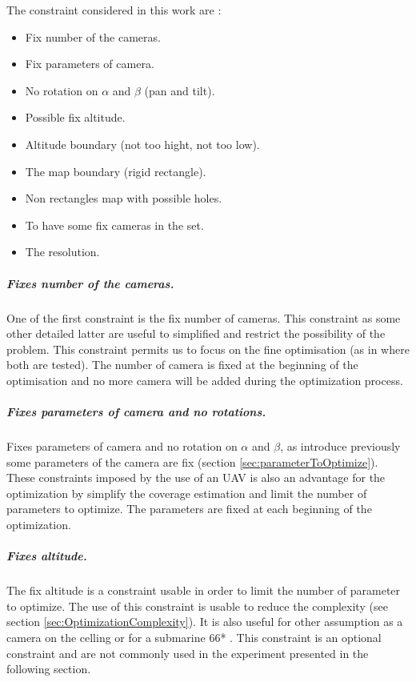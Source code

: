 The constraint considered in this work are : 
\begin{itemize}
	\item Fix number of the cameras.
	\item Fix parameters of camera.
	\item No rotation  on  $\alpha$ and $\beta$ (pan and tilt).
	\item Possible fix altitude.
	\item Altitude boundary (not too hight, not too low).  	
	\item The map boundary (rigid rectangle).  
	\item Non rectangles map with possible holes.
	\item To have some fix cameras in the set. 
	\item The resolution.\\

\end{itemize} 
\subparagraph{Fixes number of the cameras.}
One of the first constraint is the fix number of cameras. This constraint as some other detailed latter are  useful to simplified and restrict the possibility of the problem. This constraint permits us to focus on the fine optimisation (as in \citep{22*zhao2008} where both are tested). The number of camera is fixed at the beginning of the optimisation and no more camera will be added during the optimization process.  \\

\subparagraph{Fixes parameters of camera and no rotations.}
Fixes parameters of camera and no rotation on  $\alpha$ and $\beta$, as introduce previously some parameters of the camera are fix (section \ref{sec:parameterToOptimize}). These constraints imposed by the use of an UAV is also an advantage for the optimization by simplify the coverage estimation and limit the number of parameters to optimize. The parameters are fixed at each beginning of the optimization.\\

\subparagraph{Fixes altitude.}
 The fix altitude is a constraint usable in order to limit the number of parameter to optimize. The use of this constraint is usable to reduce the complexity (see section \ref{sec:OptimizationComplexity}). It is also useful for other assumption as a camera on the celling or for a submarine 66* \cite{66*}. This constraint is an optional constraint and are not commonly used in the experiment presented in the following section.   \\

